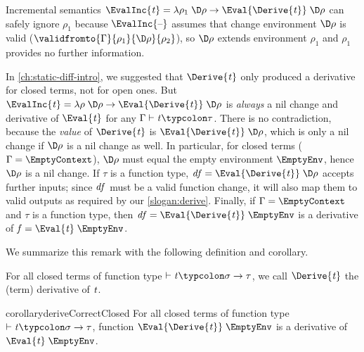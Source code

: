 \begin{remark}
Incremental semantics \ensuremath{\EvalInc{\Varid{t}}\mathrel{=}\lambda \rho_{1}\;\D\rho\to \Eval{\Derive{\Varid{t}}}\;\D\rho} can safely
ignore \ensuremath{\rho_{1}} because \ensuremath{\EvalInc{\text{\textendash}}} assumes that change environment \ensuremath{\D\rho} is valid
(\ensuremath{\validfromto{\Gamma}{\rho_{1}}{\D\rho}{\rho_{2}}}), so \ensuremath{\D\rho} extends environment \ensuremath{\rho_{1}} and \ensuremath{\rho_{1}} provides
no further information.
\end{remark}
\begin{remark}
  In \cref{ch:static-diff-intro}, we suggested that \ensuremath{\Derive{\Varid{t}}} only produced a
  derivative for closed terms, not for open ones. But \ensuremath{\EvalInc{\Varid{t}}\mathrel{=}\lambda \rho\;\D\rho\to \Eval{\Derive{\Varid{t}}}\;\D\rho} is \emph{always} a nil change and derivative of \ensuremath{\Eval{\Varid{t}}}
  for any \ensuremath{\Gamma\vdash\Varid{t}\typcolon\tau}. There is no contradiction, because the
  \emph{value} of \ensuremath{\Derive{\Varid{t}}} is \ensuremath{\Eval{\Derive{\Varid{t}}}\;\D\rho}, which is only a nil
  change if \ensuremath{\D\rho} is a nil change as well. In particular, for closed terms
  (\ensuremath{\Gamma\mathrel{=}\EmptyContext}), \ensuremath{\D\rho} must equal the empty environment \ensuremath{\EmptyEnv},
  hence \ensuremath{\D\rho} is a nil change. If \ensuremath{\tau} is a function type, \ensuremath{\Varid{df}\mathrel{=}\Eval{\Derive{\Varid{t}}}\;\D\rho}
  accepts further inputs; since \ensuremath{\Varid{df}} must be a valid function change, it will
  also map them to valid outputs as required by our \cref{slogan:derive}.
  Finally, if \ensuremath{\Gamma\mathrel{=}\EmptyContext} and \ensuremath{\tau} is a function type, then \ensuremath{\Varid{df}\mathrel{=}\Eval{\Derive{\Varid{t}}}\;\EmptyEnv} is a derivative of \ensuremath{\Varid{f}\mathrel{=}\Eval{\Varid{t}}\;\EmptyEnv}.

  We summarize this remark with the following definition and corollary.
\end{remark}
\begin{definition}
  For all closed terms of function type \ensuremath{\vdash\Varid{t}\typcolon\sigma\to \tau}, we call \ensuremath{\Derive{\Varid{t}}} the (term) derivative of \ensuremath{\Varid{t}}.
\end{definition}
\begin{restatable}{corollary}{deriveCorrectClosed}
  For all closed terms of function type \ensuremath{\vdash\Varid{t}\typcolon\sigma\to \tau}, function
  \ensuremath{\Eval{\Derive{\Varid{t}}}\;\EmptyEnv} is a derivative of \ensuremath{\Eval{\Varid{t}}\;\EmptyEnv}.
\end{restatable}
